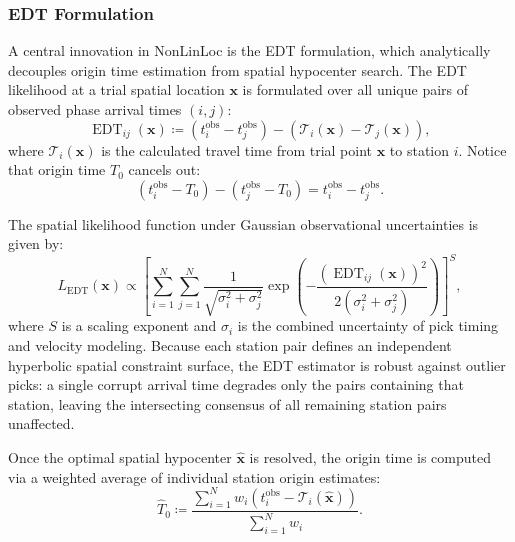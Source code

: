 \subsubsection{\acs{EDT} Formulation}
A central innovation in \ac{NonLinLoc} is the \ac{EDT}
formulation, which analytically decouples origin time estimation from
spatial hypocenter search. The
EDT likelihood at a trial spatial location $\mathbf{x}$ is
formulated over all unique pairs of observed phase arrival times $(i, j)$:
\begin{equation}
  \operatorname{EDT}_{ij}(\mathbf{x}) \coloneqq \left( t_i^{\mathrm{obs}} -
  t_j^{\mathrm{obs}} \right) - \left( \mathcal{T}_i(\mathbf{x}) -
  \mathcal{T}_j(\mathbf{x}) \right),
\end{equation}
where $\mathcal{T}_i(\mathbf{x})$ is the calculated travel time from
trial point $\mathbf{x}$ to station $i$. Notice that origin time
$T_0$ cancels out:
\begin{equation}
  (t_i^{\mathrm{obs}} - T_0) - (t_j^{\mathrm{obs}} - T_0) =
  t_i^{\mathrm{obs}} - t_j^{\mathrm{obs}}.
\end{equation}

The spatial likelihood function under Gaussian observational
uncertainties is given by:
\begin{equation}
  L_{\mathrm{EDT}}(\mathbf{x}) \propto \left[ \sum_{i = 1}^N
    \sum_{j = 1}^N \frac{1}{\sqrt{\sigma_i^2 + \sigma_j^2}} \exp\left(
      - \frac{\left(\operatorname{EDT}_{ij}(\mathbf{x})\right)^2}{2(\sigma_i^2
  + \sigma_j^2)} \right) \right]^S,
  \label{eq:edt_likelihood}
\end{equation}
where $S$ is a scaling exponent and $\sigma_i$ is the combined
uncertainty of pick timing and velocity modeling. Because each
station pair defines an independent hyperbolic spatial constraint
surface, the EDT estimator is robust against outlier picks: a single
corrupt arrival time degrades only the pairs containing that
station, leaving the intersecting consensus of all remaining station
pairs unaffected.

Once the optimal spatial hypocenter $\hat{\mathbf{x}}$ is resolved,
the origin time is computed via a weighted average of individual
station origin estimates:
\begin{equation}
  \hat{T}_0 \coloneqq \frac{\sum_{i = 1}^N w_i \left( t_i^{\mathrm{obs}} -
  \mathcal{T}_i(\hat{\mathbf{x}}) \right)}{\sum_{i = 1}^N w_i}.
\end{equation}

